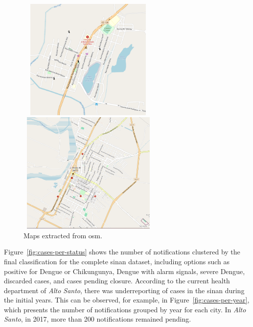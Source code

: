 \begin{figure}[ht!]
	\begin{minipage}[c]{.5\textwidth}
		\includegraphics[width=7cm, height=6cm]{images/alto-santo-osm.png}
	\end{minipage}
	\begin{minipage}[c]{.5\textwidth}
		\includegraphics[width=7cm, height=6cm]{images/limoeiro-mapa.png}
	\end{minipage}
	\caption{\label{fig:graph-examples} Maps extracted from \gls{osm}.}
\end{figure}

Figure~\ref{fig:cases-per-status} shows the number of notifications clustered by
the final classification for the complete \gls{sinan} dataset, including options
such as positive for Dengue or Chikungunya, Dengue with alarm signals, severe
Dengue, discarded cases, and cases pending closure. According to the current
health department of \textit{Alto Santo}, there was underreporting of cases in
the \gls{sinan} during the initial years. This can be observed, for example, in
Figure~\ref{fig:cases-per-year}, which presents the number of notifications
grouped by year for each city. In \textit{Alto Santo}, in 2017, more than 200
notifications remained pending.

